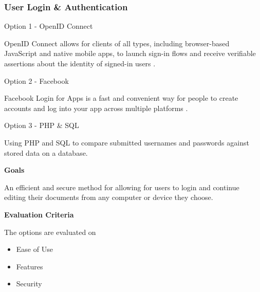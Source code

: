 \documentclass[letterpaper, 10pt, draftclsnofoot, compsoc, onecolumn]{IEEEtran}
\begin{document}
{\begin{comment}
\medskip
{\noindent\rmfamily\bfseries\color{black} Selection \par}
{\noindent Latex seems to be the best solution of the three, due to current experience using the software, as well as ease of use when creating large documents with multiple sections and headings. \par}

\end{comment}

\newpage
\subsubsection{User Login \& Authentication}
{\noindent Option 1 - OpenID Connect \par}
{\noindent OpenID Connect allows for clients of all types, including browser-based JavaScript and native mobile apps, to launch sign-in flows and receive verifiable assertions about the identity of signed-in users \cite{OpenID}. \par}

\medskip
{\noindent Option 2 - Facebook  \par}
{\noindent Facebook Login for Apps is a fast and convenient way for people to create accounts and log into your app across multiple platforms \cite{Facebook}. \par}

\medskip
{\noindent Option 3 - PHP \& SQL\par}
{\noindent Using PHP and SQL to compare submitted usernames and passwords against stored data on a database.\par}

\medskip
{\noindent\rmfamily\bfseries\color{black} Goals \par}
{\noindent An efficient and secure method for allowing for users to login and continue editing their documents from any computer or device they choose.\par}

\medskip
{\noindent\rmfamily\bfseries\color{black} Evaluation Criteria \par}
{\noindent The options are evaluated on

\begin{itemize}
\item Ease of Use
\item Features
\item Security

\end{itemize}

}}
\end{document}
